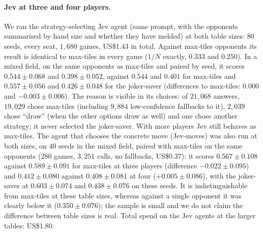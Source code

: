 \documentclass[11pt]{article}
\begin{document}
\paragraph{Jev at three and four players.} We ran the strategy-selecting Jev agent (same prompt, with the opponents summarised by hand size and whether they have melded) at both table sizes: $80$ seeds, every seat, $1{,}680$ games, US\$1.43 in total. Against max-tiles opponents its result is identical to max-tiles in every game ($1/N$ exactly, $0.333$ and $0.250$). In a mixed field, on the same opponents as max-tiles and paired by seed, it scores $0.544\pm0.068$ and $0.398\pm0.052$, against $0.544$ and $0.401$ for max-tiles and $0.557\pm0.056$ and $0.426\pm0.048$ for the joker-saver (differences to max-tiles: $0.000$ and $-0.003\pm0.006$). The reason is visible in its choices: of $21{,}068$ answers, $19{,}029$ chose max-tiles (including $9{,}884$ low-confidence fallbacks to it), $2{,}039$ chose ``draw'' (when the other options draw as well) and one chose another strategy; it never selected the joker-saver. With more players Jev still behaves as max-tiles. The agent that chooses the concrete move (Jev-moves) was also run at both sizes, on $40$ seeds in the mixed field, paired with max-tiles on the same opponents ($280$ games, $3{,}251$ calls, no fallbacks, US\$0.37): it scores $0.567\pm0.108$ against $0.589\pm0.091$ for max-tiles at three players (difference $-0.022\pm0.095$) and $0.412\pm0.080$ against $0.408\pm0.081$ at four ($+0.005\pm0.086$), with the joker-saver at $0.603\pm0.074$ and $0.438\pm0.076$ on these seeds. It is indistinguishable from max-tiles at these table sizes, whereas against a single opponent it was clearly below it ($0.350\pm0.076$); the sample is small and we do not claim the difference between table sizes is real. Total spend on the Jev agents at the larger tables: US\$1.80.
\end{document}
